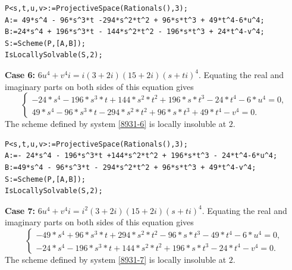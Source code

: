 \documentclass[a4paper,12pt,english,reqno]{amsart}
\begin{document}
\begin{lstlisting}
P<s,t,u,v>:=ProjectiveSpace(Rationals(),3);
A:= 49*s^4 - 96*s^3*t -294*s^2*t^2 + 96*s*t^3 + 49*t^4-6*u^4;
B:=24*s^4 + 196*s^3*t - 144*s^2*t^2 - 196*s*t^3 + 24*t^4-v^4;
S:=Scheme(P,[A,B]);
IsLocallySolvable(S,2);
\end{lstlisting}

{\bf Case 6:} $6u^4+v^4i=i(3+2i)(15+2i)(s+ti)^4$. Equating the real and imaginary parts on both sides of this equation gives
\begin{equation}\label{8931-6}
\begin{cases}
-24*s^4 - 196*s^3*t + 144*s^2*t^2 + 196*s*t^3 - 24*t^4 - 6*u^4=0,\\
49*s^4 - 96*s^3*t - 294*s^2*t^2 + 96*s*t^3 + 49*t^4 - v^4=0.
\end{cases}
\end{equation}
The scheme defined by system \eqref{8931-6} is locally insoluble at $2$.

\begin{lstlisting}
P<s,t,u,v>:=ProjectiveSpace(Rationals(),3);
A:=- 24*s^4 - 196*s^3*t +144*s^2*t^2 + 196*s*t^3 - 24*t^4-6*u^4;
B:=49*s^4 - 96*s^3*t - 294*s^2*t^2 + 96*s*t^3 + 49*t^4-v^4;
S:=Scheme(P,[A,B]);
IsLocallySolvable(S,2);
\end{lstlisting}

{\bf Case 7:} $6u^4+v^4i=i^2(3+2i)(15+2i)(s+ti)^4$.  Equating the real and imaginary parts on both sides of this equation gives
\begin{equation}\label{8931-7}
\begin{cases}
-49*s^4 + 96*s^3*t + 294*s^2*t^2 - 96*s*t^3 - 49*t^4 - 6*u^4=0,\\
-24*s^4 - 196*s^3*t + 144*s^2*t^2 + 196*s*t^3 - 24*t^4 - v^4=0.
\end{cases}
\end{equation}
The scheme defined by system \eqref{8931-7} is locally insoluble at $2$.
\end{document}
